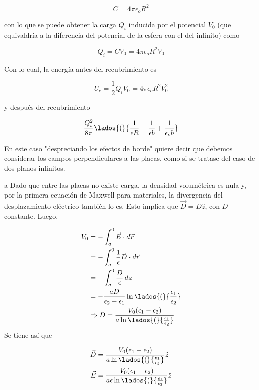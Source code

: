 \begin{solucion}{9}
\[C=4\pi\epsilon_oR^2\]

con lo que se puede obtener la carga $Q_i$ inducida por el potencial $V_0$ (que equivaldría a la diferencia del potencial de la esfera con el del infinito) como

\[Q_i = CV_0 = 4\pi\epsilon_oR^2V_0\]

Con lo cual, la energía antes del recubrimiento es

\[U_e = \frac{1}{2}Q_iV_0 = 4\pi\epsilon_oR^2V_0^2\]

y después del recubrimiento

\[\frac{Q_i^2}{8\pi}\lados{(}{\frac{1}{\epsilon R}
-\frac{1}{\epsilon b}+\frac{1}{\epsilon_ob}}\]

\end{solucion}
\bigbreak

\begin{solucion}{10}

En este caso "despreciando los efectos de borde" quiere decir que debemos considerar los campos perpendiculares a las placas, como si se tratase del caso de dos planos infinitos. %

\ics a 
Dado que entre las placas no existe carga, la densidad volumétrica es nula y, por la primera ecuación de Maxwell para materiales, la divergencia del desplazamiento eléctrico también lo es. Esto implica que $\Vec{D} = D\hat{z}$, con $D$ constante. Luego,

\begin{equation}
\begin{split}
    V_0 &= -\int^0_a\Vec{E}\cdot d\Vec{r}\\
    &= -\int^0_a\frac{1}{\epsilon}\Vec{D}\cdot d\Vec{r}\\
    &= -\int^0_a\frac{D}{\epsilon}\,dz\\
    &= -\frac{aD}{\epsilon_2-\epsilon_1}
    \ln{\lados{(}{\frac{\epsilon_1}{\epsilon_2}}}\\
    &\Rightarrow D = \frac{V_0(\epsilon_1-\epsilon_2)}{a\ln{\lados{(}{\frac{\epsilon_1}{\epsilon_2}}}}\\
\end{split}
\nonumber
\end{equation}
\newpage
Se tiene así que

\begin{equation}
\begin{split}
    \Vec{D} &= \frac{V_0(\epsilon_1-\epsilon_2)}{a\ln{\lados{(}{\frac{\epsilon_1}{\epsilon_2}}}}\hat{z}\\
    \Vec{E} &= \frac{V_0(\epsilon_1-\epsilon_2)}{a\epsilon\ln{\lados{(}{\frac{\epsilon_1}{\epsilon_2}}}}\hat{z}\\
\end{split}
\nonumber
\end{equation}


\end{solucion}
